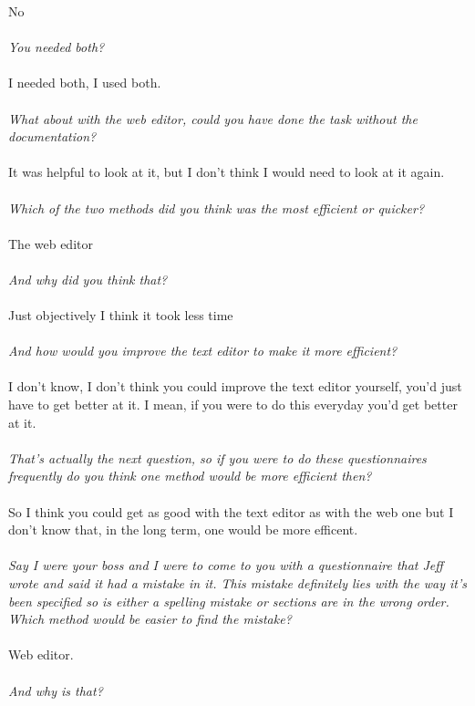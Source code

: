 No
\\
\\
\textit{You needed both?}
\\
\\
I needed both, I used both.
\\
\\
\textit{What about with the web editor, could you have done the task without the documentation?}
\\
\\
It was helpful to look at it, but I don't think I would need to look at it again.
\\
\\
\textit{Which of the two methods did you think was the most efficient or quicker?}
\\
\\
The web editor
\\
\\
\textit{And why did you think that?}
\\
\\
Just objectively I think it took less time
\\
\\
\textit{And how would you improve the text editor to make it more efficient?}
\\
\\
I don't know, I don't think you could improve the text editor yourself, you'd just have to get better at it. I mean, if you were to do this everyday you'd get better at it.
\\
\\
\textit{That's actually the next question, so if you were to do these questionnaires frequently do you think one method would be more efficient then?}
\\
\\
So I think you could get as good with the text editor as with the web one but I don't know that, in the long term, one would be more efficent.
\\
\\
\textit{Say I were your boss and I were to come to you with a questionnaire that Jeff wrote and said it had a mistake in it. This mistake definitely lies with the way it's been specified so is either a spelling mistake or sections are in the wrong order. Which method would be easier to find the mistake?}
\\
\\
Web editor.
\\
\\
\textit{And why is that?}
\\
